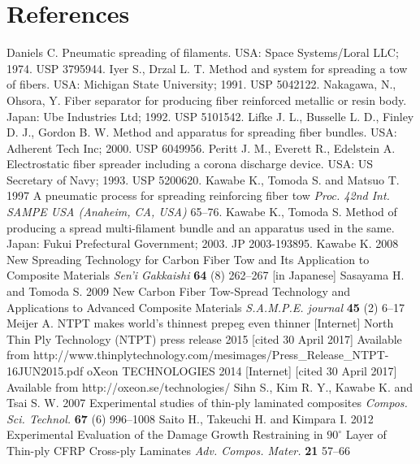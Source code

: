 \section*{References}
\begin{thebibliography}{9}
Daniels C. Pneumatic spreading of filaments. USA: Space Systems/Loral LLC; 1974. USP 3795944.
Iyer S., Drzal L. T. Method and system for spreading a tow of fibers. USA: Michigan State University; 1991. USP 5042122.
Nakagawa, N., Ohsora, Y. Fiber separator for producing fiber reinforced metallic or resin body. Japan: Ube Industries Ltd; 1992. USP 5101542.
Lifke J. L., Busselle L. D., Finley D. J., Gordon B. W. Method and apparatus for spreading fiber bundles. USA: Adherent Tech Inc; 2000. USP 6049956.
Peritt J. M., Everett R., Edelstein A. Electrostatic fiber spreader including a corona discharge device. USA: US Secretary of Navy; 1993. USP 5200620.
Kawabe K., Tomoda S. and Matsuo T. 1997 A pneumatic process for spreading reinforcing fiber tow {\it Proc. 42nd Int. SAMPE USA (Anaheim, CA, USA)} 65–76.
Kawabe K., Tomoda S. Method of producing a spread multi-filament bundle and an apparatus used in the same. Japan: Fukui Prefectural Government; 2003. JP 2003-193895.
 Kawabe K. 2008 New Spreading Technology for Carbon Fiber Tow and Its Application to Composite Materials {\it Sen'i Gakkaishi} {\bf 64} (8) 262--267 [in Japanese]
 Sasayama H. and Tomoda S. 2009 New Carbon Fiber Tow-Spread Technology and Applications to Advanced Composite Materials {\it S.A.M.P.E. journal} {\bf 45} (2) 6--17
Meijer A. NTPT makes world’s thinnest prepeg even thinner [Internet] North Thin Ply Technology (NTPT) press release 2015 [cited 30 April 2017] Available from http://www.thinplytechnology.com/mesimages/Press\_Release\_NTPT-16JUN2015.pdf
oXeon TECHNOLOGIES 2014 [Internet] [cited 30 April 2017] Available from http://oxeon.se/technologies/
Sihn S., Kim R. Y., Kawabe K. and Tsai S. W. 2007 Experimental studies of thin-ply laminated composites {\it Compos. Sci. Technol.} {\bf 67} (6) 996--1008
Saito H., Takeuchi H. and Kimpara I. 2012 Experimental Evaluation of the Damage Growth Restraining in $90^{\circ}$ Layer of Thin-ply CFRP Cross-ply Laminates {\it Adv. Compos. Mater.} {\bf 21} 57--66

\end{thebibliography}
